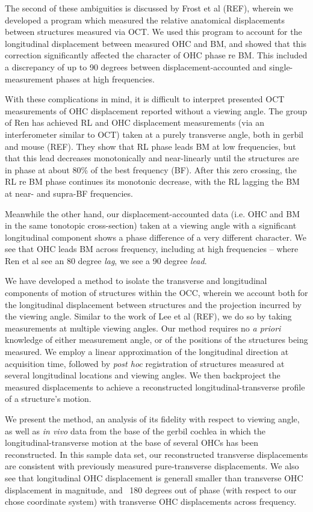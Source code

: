 \documentclass[aip,cp,amsmath,amssymb,reprint]{revtex4-2}
\begin{document}
\par{The second of these ambiguities is discussed by Frost et al (REF), wherein we developed a program which measured the relative anatomical displacements between structures measured via OCT. We used this program to account for the longitudinal displacement between measured OHC and BM, and showed that this correction significantly affected the character of OHC phase re BM. This included a discrepancy of up to 90 degrees between displacement-accounted and single-measurement phases at high frequencies.}
\par{With these complications in mind, it is difficult to interpret presented OCT measurements of OHC displacement reported without a viewing angle. The group of Ren has achieved RL and OHC displacement measurements (via an interferometer similar to OCT) taken at a purely transverse angle, both in gerbil and mouse (REF). They show that RL phase leads BM at low frequencies, but that this lead decreases monotonically and near-linearly until the structures are in phase at about 80\% of the best frequency (BF). After this zero crossing, the RL re BM phase continues its monotonic decrease, with the RL lagging the BM at near- and supra-BF frequencies.}
\par{Meanwhile the other hand, our displacement-accounted data (i.e. OHC and BM in the same tonotopic cross-section) taken at a viewing angle with a significant longitudinal component shows a phase difference of a very different character. We see that OHC leads BM across frequency, including at high frequencies -- where Ren et al see an 80 degree \textit{lag}, we see a 90 degree \textit{lead}.}
\par{We have developed a method to isolate the transverse and longitudinal components of motion of structures within the OCC, wherein we account both for the longitudinal displacement between structures and the projection incurred by the viewing angle. Similar to the work of Lee et al (REF), we do so by taking measurements at multiple viewing angles. Our method requires no \textit{a priori} knowledge of either measurement angle, or of the positions of the structures being measured. We employ a linear approximation of the longitudinal direction at acquisition time, followed by \textit{post hoc} registration of structures measured at several longitudinal locations and viewing angles. We then backproject the measured displacements to achieve a reconstructed longitudinal-transverse profile of a structure's motion.}
\par{We present the method, an analysis of its fidelity with respect to viewing angle, as well as \textit{in vivo} data from the base of the gerbil cochlea in which the longitudinal-transverse motion at the base of several OHCs has been reconstructed. In this sample data set, our reconstructed transverse displacements are consistent with previously measured pure-transverse displacements. We also see that longitudinal OHC displacement is generall smaller than transverse OHC displacement in magnitude, and ~180 degrees out of phase (with respect to our chose coordinate system) with transverse OHC displacements across frequency.}
\end{document}

